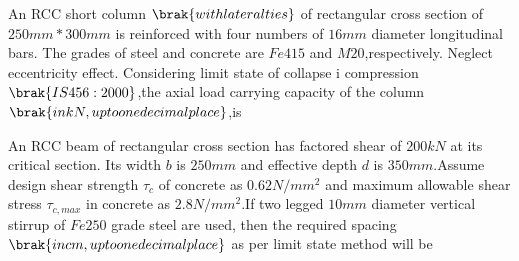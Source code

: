 

\iffalse
    \title{Assignment}
    \author{EE24BTECH11028}
    \section{ce}
    \chapter{2018}
  \fi
    \item An RCC short column $\brak{with lateral ties}$ of rectangular cross section of $250 mm * 300 mm$ is reinforced with four numbers of $16 mm$ diameter longitudinal bars. The grades of steel and concrete are $Fe415$ and $M20$,respectively. Neglect eccentricity effect. Considering limit state of collapse i  compression $\brak{IS 456 : 2000}$,the axial load carrying capacity of the column $\brak{in kN, up to one decimal place}$,is \\
 \item An  RCC beam of rectangular cross section has factored shear of $200 kN$ at its critical section. Its width $b$ is $250 mm$ and effective depth $d$ is $350 mm$.Assume design shear strength $\tau_{c}$ of concrete as $0.62 N/mm^{2}$ and maximum allowable shear stress $\tau_{c,max}$ in concrete as $2.8 N/mm^{2}$.If two legged $10 mm$ diameter vertical stirrup of $Fe250$ grade steel are used, then the required spacing $\brak{in cm,up to one decimal place}$ as per limit state method will be\\
 \begin{figure}[h!]
    \centering
\end{figure}\\
